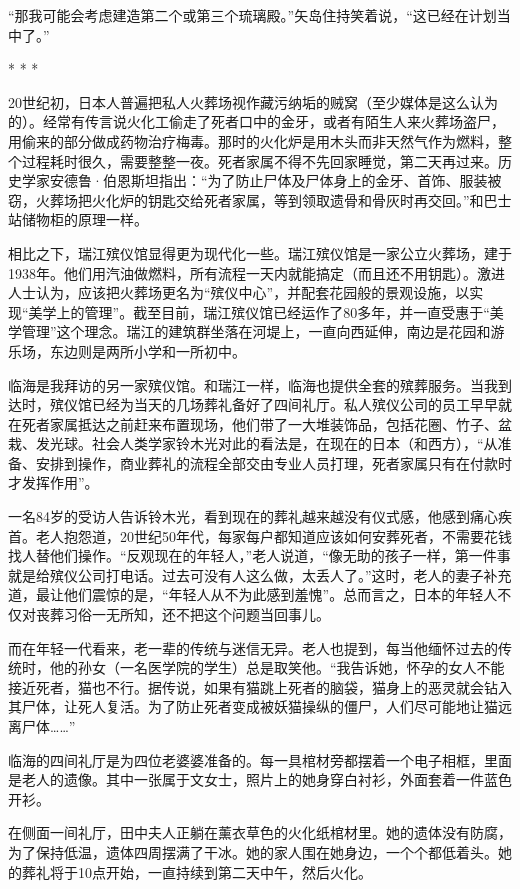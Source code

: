 \documentclass[12pt,oneside]{book}
\begin{document}
\begin{bookref}[frametitle={\cite{好好告别}}]
“那我可能会考虑建造第二个或第三个琉璃殿。”矢岛住持笑着说，“这已经在计划当中了。”
\begin{center}
* * *
\end{center}

20世纪初，日本人普遍把私人火葬场视作藏污纳垢的贼窝（至少媒体是这么认为的）。经常有传言说火化工偷走了死者口中的金牙，或者有陌生人来火葬场盗尸，用偷来的部分做成药物治疗梅毒。那时的火化炉是用木头而非天然气作为燃料，整个过程耗时很久，需要整整一夜。死者家属不得不先回家睡觉，第二天再过来。历史学家安德鲁·伯恩斯坦指出：“为了防止尸体及尸体身上的金牙、首饰、服装被窃，火葬场把火化炉的钥匙交给死者家属，等到领取遗骨和骨灰时再交回。”和巴士站储物柜的原理一样。

相比之下，瑞江殡仪馆显得更为现代化一些。瑞江殡仪馆是一家公立火葬场，建于1938年。他们用汽油做燃料，所有流程一天内就能搞定（而且还不用钥匙）。激进人士认为，应该把火葬场更名为“殡仪中心”，并配套花园般的景观设施，以实现“美学上的管理”。截至目前，瑞江殡仪馆已经运作了80多年，并一直受惠于“美学管理”这个理念。瑞江的建筑群坐落在河堤上，一直向西延伸，南边是花园和游乐场，东边则是两所小学和一所初中。

临海是我拜访的另一家殡仪馆。和瑞江一样，临海也提供全套的殡葬服务。当我到达时，殡仪馆已经为当天的几场葬礼备好了四间礼厅。私人殡仪公司的员工早早就在死者家属抵达之前赶来布置现场，他们带了一大堆装饰品，包括花圈、竹子、盆栽、发光球。社会人类学家铃木光对此的看法是，在现在的日本（和西方），“从准备、安排到操作，商业葬礼的流程全部交由专业人员打理，死者家属只有在付款时才发挥作用”。

一名84岁的受访人告诉铃木光，看到现在的葬礼越来越没有仪式感，他感到痛心疾首。老人抱怨道，20世纪50年代，每家每户都知道应该如何安葬死者，不需要花钱找人替他们操作。“反观现在的年轻人，”老人说道，“像无助的孩子一样，第一件事就是给殡仪公司打电话。过去可没有人这么做，太丢人了。”这时，老人的妻子补充道，最让他们震惊的是，“年轻人从不为此感到羞愧”。总而言之，日本的年轻人不仅对丧葬习俗一无所知，还不把这个问题当回事儿。

而在年轻一代看来，老一辈的传统与迷信无异。老人也提到，每当他缅怀过去的传统时，他的孙女（一名医学院的学生）总是取笑他。“我告诉她，怀孕的女人不能接近死者，猫也不行。据传说，如果有猫跳上死者的脑袋，猫身上的恶灵就会钻入其尸体，让死人复活。为了防止死者变成被妖猫操纵的僵尸，人们尽可能地让猫远离尸体……”

临海的四间礼厅是为四位老婆婆准备的。每一具棺材旁都摆着一个电子相框，里面是老人的遗像。其中一张属于文女士，照片上的她身穿白衬衫，外面套着一件蓝色开衫。

在侧面一间礼厅，田中夫人正躺在薰衣草色的火化纸棺材里。她的遗体没有防腐，为了保持低温，遗体四周摆满了干冰。她的家人围在她身边，一个个都低着头。她的葬礼将于10点开始，一直持续到第二天中午，然后火化。


\end{bookref}
\end{document}
